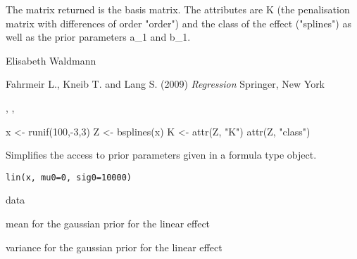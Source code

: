 \documentclass[a4paper]{book}
\begin{document}
%
\begin{Value}


The matrix returned is the basis matrix. The attributes are
K (the penalisation matrix with differences of order "order") and the class of the effect ("splines") as well as the prior parameters a\_1 and b\_1.

\end{Value}
%
\begin{Author}\relax
Elisabeth Waldmann


\end{Author}
%
\begin{References}\relax

Fahrmeir L., Kneib T. and Lang S. (2009) \emph{Regression} Springer, New York
\end{References}
%
\begin{SeeAlso}\relax
{}, , 
\end{SeeAlso}
%
\begin{Examples}
\begin{ExampleCode}
x <- runif(100,-3,3)
Z <- bsplines(x)
K <- attr(Z, "K")
attr(Z, "class")
\end{ExampleCode}
\end{Examples}
%
\begin{Description}\relax

Simplifies the access to prior parameters given in a formula type object.
\end{Description}
%
\begin{Usage}
\begin{verbatim}
lin(x, mu0=0, sig0=10000)
\end{verbatim}
\end{Usage}
%
\begin{Arguments}
\begin{ldescription}
\item[\code{x}] 
data

\item[\code{mu0}] 
mean for the gaussian prior for the linear effect

\item[\code{sig0}] 
variance for the gaussian prior for the linear effect


\end{ldescription}
\end{Arguments}
\end{document}
